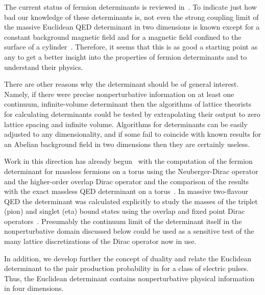 \documentclass[a4paper,twocolumn,showpacs,preprintnumbers,amsmath,amssymb]{revtex4}
\begin{document}
The current status of fermion determinants is reviewed
in~\cite{Fry02}. To indicate just how bad our knowledge of these
determinants is, not even the strong coupling limit of the massive
Euclidean QED determinant in two dimensions is known except for a
constant background magnetic field and for a magnetic field confined
to the surface of a cylinder~\cite{Fry95}.  Therefore, it seems that
this is as good a starting point as any to get a better insight into
the properties of fermion determinants and to understand their
physics.

There are other reasons why the \coordHE{} determinant should be
of general interest. Namely, if there were precise nonperturbative
information on at least one continuum, infinite-volume determinant
then the algorithms of lattice theorists for calculating determinants
could be tested by extrapolating their output to zero lattice spacing
and infinite volume. Algorithms for determinants can be easily
adjusted to any dimensionality, and if some fail to coincide with
known results for an Abelian background field in two dimensions then
they are certainly useless.

Work in this direction has already begun~\cite{Chiu00} with the
computation of the fermion determinant for massless fermions on a
torus using the Neuberger-Dirac operator and the higher-order overlap
Dirac operator and the comparison of the results with the exact
massless QED\coordHE{} determinant on a torus~\cite{Sachs92}. In massive
two-flavour QED\coordHE{} the determinant was calculated explicitly to study
the masses of the triplet (pion) and singlet (eta) bound states
using the overlap and fixed point Dirac
operators~\cite{Hausler01}. Presumably the continuum limit of the
determinant itself in the nonperturbative domain discussed below could
be used as a sensitive test of the many lattice discretizations of the
Dirac operator now in use.


In addition, we develop further the concept of duality and relate the
Euclidean \coordHE{} determinant to the pair production
probability in \coordHE{} for a class of electric pulses. Thus,
the Euclidean \coordHE{} determinant contains nonperturbative
physical information in four dimensions.
\end{document}
